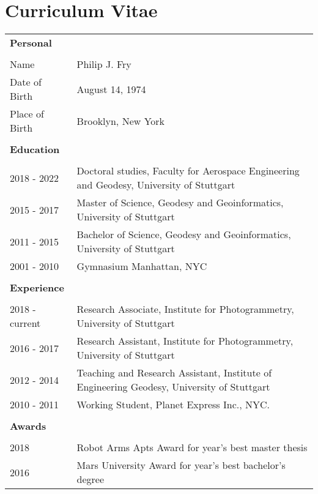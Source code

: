 
\chapter*{Curriculum Vitae} 


\begin{table*}[htbp]
	\centering
	\begin{tabular}{ll}
		\hspace{-0.25cm}\Large{\textbf{Personal}} & \\
		\vspace{-0.25cm} & \\
		Name & Philip J. Fry\\
		Date of Birth & August 14, 1974\\
		Place of Birth &  Brooklyn, New York  \\
		\vspace*{0.5cm} & \\
		\hspace{-0.25cm}\Large{\textbf{Education}} & \\
		\vspace{-0.25cm} & \\
		2018 - 2022 & Doctoral studies, Faculty for Aerospace Engineering and Geodesy, University of Stuttgart \\
		2015 - 2017 & Master of Science, Geodesy and Geoinformatics, University of Stuttgart \\
		2011 - 2015 & Bachelor of Science, Geodesy and Geoinformatics, University of Stuttgart \\
		2001 - 2010 & Gymnasium Manhattan, NYC \\
		\vspace*{0.5cm}  & \\
		\hspace{-0.25cm}\Large{\textbf{Experience}} & \\
		\vspace{-0.25cm} & \\
		2018 - current & Research Associate, Institute for Photogrammetry, University of Stuttgart \\
		2016 - 2017 & Research Assistant, Institute for Photogrammetry, University of Stuttgart \\
		2012 - 2014 & Teaching and Research Assistant, Institute of Engineering Geodesy, University of Stuttgart \\
		2010 - 2011 & Working Student,  Planet Express Inc., NYC. \\
		\vspace*{0.5cm}  & \\
		\hspace{-0.25cm}\Large{\textbf{Awards}} & \\
		\vspace{-0.25cm} & \\
		2018 &  Robot Arms Apts Award for year’s best master thesis \\
		2016 &  Mars University Award for year’s best bachelor’s degree \\
	\end{tabular}
\end{table*}


